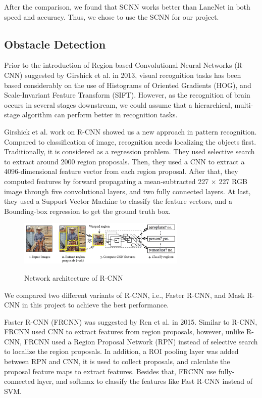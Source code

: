 \documentclass[runningheads]{llncs}
\begin{document}
After the comparison, we found that SCNN works better than 
LaneNet in both speed and accuracy. Thus, we chose to use 
the SCNN for our project. 


\subsection{Obstacle Detection}
Prior to the introduction of Region-based Convolutional 
Neural Networks (R-CNN) suggested by Girshick et al. 
\cite{RCNN} in 2013, visual recognition tasks has been 
based considerably on the use of Histograms of Oriented 
Gradients (HOG)\cite{HOG}, and Scale-Invariant Feature 
Transform (SIFT)\cite{SIFT}. However, as the recognition of 
brain occurs in several stages downstream, we could assume 
that a hierarchical, multi-stage algorithm can perform better in 
recognition tasks. 

Girshick et al. work on R-CNN showed us a new approach in 
pattern recognition. Compared to classification of image, 
recognition needs localizing the objects first. 
Traditionally, it is considered as a regression problem. 
They used selective search to extract around 2000 region 
proposals. Then, they used a CNN to extract a 
4096-dimensional feature vector from each region proposal. 
After that, they computed features by forward propagating
a mean-subtracted 227 × 227 RGB image through five 
convolutional layers, and two fully connected layers. At 
last, they used a Support Vector Machine to classify the 
feature vectors, and a Bounding-box regression to get the 
ground truth box. 

\begin{figure}
    \centering
    \includegraphics[width=8cm]{reference/rcnn}
    \label{fig:RCNN}
    \caption{Network architecture of R-CNN}
\end{figure}

We compared two different variants of R-CNN, i.e., 
Faster R-CNN, and Mask R-CNN in this project to achieve the 
best performance. 

Faster R-CNN\cite{FasterRCNN} (FRCNN) was suggested by Ren 
et al. in 2015. Similar to R-CNN, FRCNN used CNN to 
extract features from region proposals, however, unlike 
R-CNN, FRCNN used a Region Proposal Network (RPN) instead 
of selective search to localize the region proposals. In 
addition, a ROI pooling layer was added between RPN and 
CNN, it is used to collect proposals, and calculate the 
proposal feature maps to extract features. Besides that, FRCNN 
use fully-connected layer, and softmax to classify the 
features like Fast R-CNN instead of SVM. 
\end{document}
